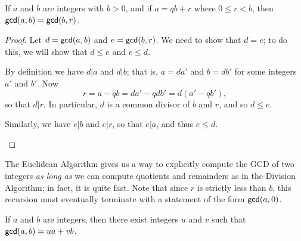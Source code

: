 \begin{prop}
If \(a\) and \(b\) are integers with \(b > 0\), and if \(a = qb + r\) where \(0 \leq r < b\), then \(\mathsf{gcd}(a, b) = \mathsf{gcd}(b, r)\).
\end{prop}

\begin{proof}
Let \(d = \mathsf{gcd}(a, b)\) and \(e = \mathsf{gcd}(b, r)\).
We need to show that \(d = e\); to do this, we will show that \(d \leq e\) and \(e \leq d\).
\begin{proplist}
\item By definition we have \(d|a\) and \(d|b\); that is, \(a = da'\) and \(b = db'\) for some integers \(a'\) and \(b'\).
Now \[ r = a - qb = da' - qdb' = d(a' - qb'), \] so that \(d|r\).
In particular, \(d\) is a common divisor of \(b\) and \(r\), and so \(d \leq e\).
\item Similarly, we have \(e|b\) and \(e|r\), so that \(e|a\), and thus \(e \leq d\).
\end{proplist}
\end{proof}

The Euclidean Algorithm gives us a way to explicitly compute the GCD of two integers \emph{as long as} we can compute quotients and remainders as in the Division Algorithm; in fact, it is quite fast.
Note that since \(r\) is strictly less than \(b\), this recursion must eventually terminate with a statement of the form \(\mathsf{gcd}(a, 0)\).


\begin{thm}
If \(a\) and \(b\) are integers, then there exist integers \(u\) and \(v\) such that \(\mathsf{gcd}(a, b) = ua + vb\).
\end{thm}

